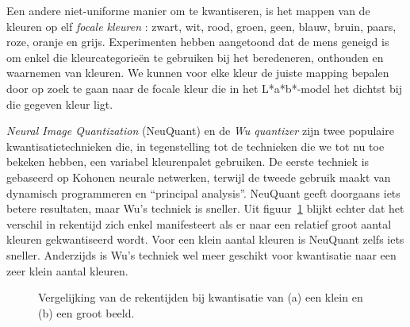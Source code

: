 Een andere niet-uniforme manier om te kwantiseren, is het mappen van de kleuren op elf 
\emph{focale kleuren} \cite{van_den_broek:human_color_categorization_for_cbir}: zwart, wit, rood, groen, geen, blauw, bruin, paars, roze, oranje en grijs.
Experimenten hebben aangetoond dat de mens geneigd is om enkel die kleurcategorie\"en te gebruiken bij 
het beredeneren, onthouden en waarnemen van kleuren. We kunnen voor elke kleur de juiste mapping bepalen
door op zoek te gaan naar de focale kleur die in het L*a*b*-model het dichtst bij die gegeven kleur ligt.

\emph{Neural Image Quantization} (NeuQuant) \cite{dekker:neuquant} en de \emph{Wu quantizer} 
\cite{wu:color_quantization_by_dynamic_programming_and_principal_analysis} zijn twee
populaire kwantisatietechnieken die, in tegenstelling tot de technieken die we 
tot nu toe bekeken hebben, een variabel kleurenpalet gebruiken. De eerste techniek is gebaseerd op
Kohonen neurale netwerken, terwijl de tweede gebruik maakt van dynamisch programmeren
en ``principal analysis''. NeuQuant geeft doorgaans iets betere resultaten, maar Wu's techniek is
sneller. Uit figuur~\ref{fig:rekentijden_quant} blijkt echter dat het verschil in rekentijd zich
enkel manifesteert als er naar een relatief groot aantal kleuren gekwantiseerd wordt. Voor een
klein aantal kleuren is NeuQuant zelfs iets sneller. Anderzijds is Wu's techniek wel meer
geschikt voor kwantisatie naar een zeer klein aantal kleuren.
 

\begin{figure}[tbp]
\begin{center}
\caption{\label{fig:rekentijden_quant}Vergelijking van de rekentijden bij kwantisatie van (a) een klein en (b) een groot beeld.}
\end{center}
\end{figure}

